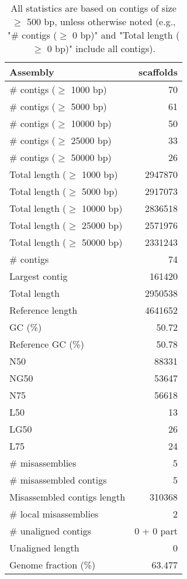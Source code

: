 \documentclass[12pt,a4paper]{article}
\begin{document}
\begin{table}[ht]
\begin{center}
\caption{All statistics are based on contigs of size $\geq$ 500 bp, unless otherwise noted (e.g., "\# contigs ($\geq$ 0 bp)" and "Total length ($\geq$ 0 bp)" include all contigs).}
\begin{tabular}{|l*{1}{|r}|}
\hline
Assembly & scaffolds \\ \hline
\# contigs ($\geq$ 1000 bp) & 70 \\ \hline
\# contigs ($\geq$ 5000 bp) & 61 \\ \hline
\# contigs ($\geq$ 10000 bp) & 50 \\ \hline
\# contigs ($\geq$ 25000 bp) & 33 \\ \hline
\# contigs ($\geq$ 50000 bp) & 26 \\ \hline
Total length ($\geq$ 1000 bp) & 2947870 \\ \hline
Total length ($\geq$ 5000 bp) & 2917073 \\ \hline
Total length ($\geq$ 10000 bp) & 2836518 \\ \hline
Total length ($\geq$ 25000 bp) & 2571976 \\ \hline
Total length ($\geq$ 50000 bp) & 2331243 \\ \hline
\# contigs & 74 \\ \hline
Largest contig & 161420 \\ \hline
Total length & 2950538 \\ \hline
Reference length & 4641652 \\ \hline
GC (\%) & 50.72 \\ \hline
Reference GC (\%) & 50.78 \\ \hline
N50 & 88331 \\ \hline
NG50 & 53647 \\ \hline
N75 & 56618 \\ \hline
L50 & 13 \\ \hline
LG50 & 26 \\ \hline
L75 & 24 \\ \hline
\# misassemblies & 5 \\ \hline
\# misassembled contigs & 5 \\ \hline
Misassembled contigs length & 310368 \\ \hline
\# local misassemblies & 2 \\ \hline
\# unaligned contigs & 0 + 0 part \\ \hline
Unaligned length & 0 \\ \hline
Genome fraction (\%) & 63.477 \\ \hline

\end{tabular}
\end{center}
\end{table}
\end{document}
